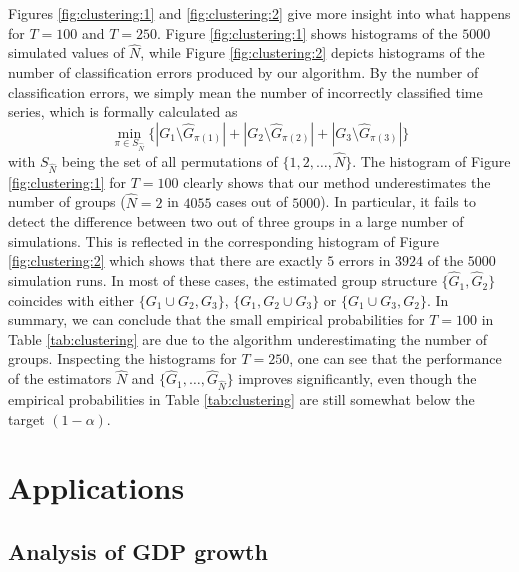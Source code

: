 \documentclass[a4paper,12pt]{article}
\begin{document}
Figures \ref{fig:clustering:1} and \ref{fig:clustering:2} give more insight into what happens for $T=100$ and $T=250$. Figure \ref{fig:clustering:1} shows histograms of the $5000$ simulated values of $\widehat{N}$, while Figure \ref{fig:clustering:2} depicts histograms of the number of classification errors produced by our algorithm. By the number of classification errors, we simply mean the number of incorrectly classified time series, which is formally calculated as 
\[ \min_{\pi \in S_{\hat{N}}} \big\{ |G_1 \setminus \widehat{G}_{\pi(1)}| +|G_2 \setminus \widehat{G}_{\pi(2)}| + |G_3 \setminus \widehat{G}_{\pi(3)}| \big\} \]
with $S_{\widehat{N}}$ being the set of all permutations of $\{1, 2, \ldots, \widehat{N}\}$. The histogram of Figure \ref{fig:clustering:1} for $T=100$ clearly shows that our method underestimates the number of groups ($\widehat{N} = 2$ in $4055$ cases out of $5000$). In particular, it fails to detect the difference between two out of three groups in a large number of simulations. This is reflected in the corresponding histogram of Figure \ref{fig:clustering:2} which shows that there are exactly $5$ errors in $3924$ of the $5000$ simulation runs. In most of these cases, the estimated group structure $\{ \widehat{G}_1, \widehat{G}_{2}\}$ coincides with either $\{ G_1 \cup G_2,G_3\}$,  $\{ G_1, G_2\cup G_3\}$ or $ \{ G_1 \cup G_3,G_2\}$. In summary, we can conclude that the small empirical probabilities for $T=100$ in Table \ref{tab:clustering} are due to the algorithm underestimating the number of groups. Inspecting the histograms for $T=250$, one can see that the performance of the estimators $\widehat{N}$ and $\{ \widehat{G}_1,\ldots, \widehat{G}_{\widehat{N}} \}$ improves significantly, even though the empirical probabilities in Table \ref{tab:clustering} are still somewhat below the target $(1-\alpha)$.  



\section{Applications}\label{sec:app}
\subsection{Analysis of GDP growth}\label{subsec:app:gdp}
\end{document}
